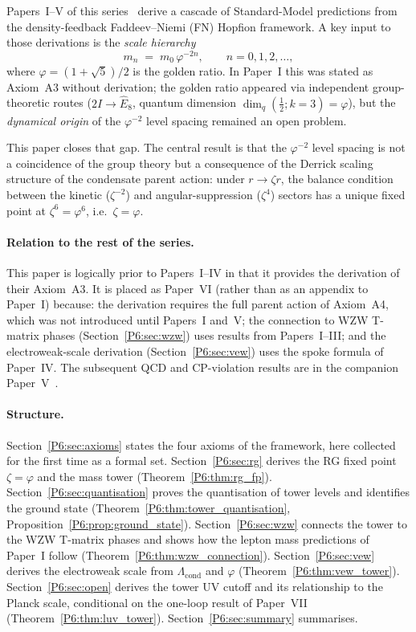 \documentclass[11pt,a4paper]{article}
\theoremstyle{definition}
\theoremstyle{remark}
\newcommand{\vp}{\varphi}
\newcommand{\Lcond}{\Lambda_{\mathrm{cond}}}
\begin{document}
Papers~I--V of this series~\cite{Paper1,Paper2,Paper3,Paper4,Paper5} derive
a cascade of Standard-Model predictions from the density-feedback
Faddeev--Niemi (FN) Hopfion framework.  A key input to those derivations
is the \emph{scale hierarchy}
\begin{equation}
  m_n \;=\; m_0\,\vp^{-2n}, \qquad n = 0, 1, 2, \ldots,
  \label{P6:eq:tower_intro}
\end{equation}
where $\vp = (1+\sqrt{5})/2$ is the golden ratio.  In Paper~I this
was stated as Axiom~A3 without derivation; the golden ratio appeared
via independent group-theoretic routes ($2I \to \hat{E}_8$, quantum
dimension $\dim_q(\tfrac{1}{2};k{=}3)=\vp$), but the \emph{dynamical
origin} of the $\vp^{-2}$ level spacing remained an open problem.

This paper closes that gap.  The central result is that the $\vp^{-2}$
level spacing is not a coincidence of the group theory but a
consequence of the Derrick scaling structure of the condensate parent
action: under $r \to \zeta r$, the balance condition between the
kinetic ($\zeta^{-2}$) and angular-suppression ($\zeta^4$) sectors has
a unique fixed point at $\zeta^6 = \vp^6$, i.e.\ $\zeta = \vp$.

\paragraph{Relation to the rest of the series.}
This paper is logically prior to Papers~I--IV in that it provides the
derivation of their Axiom~A3.  It is placed as Paper~VI (rather than
as an appendix to Paper~I) because: the derivation requires the full
parent action of Axiom~A4, which was not introduced until Papers~I
and~V; the connection to WZW T-matrix phases (Section~\ref{P6:sec:wzw})
uses results from Papers~I--III; and the electroweak-scale derivation
(Section~\ref{P6:sec:vew}) uses the spoke formula of Paper~IV.
The subsequent QCD and CP-violation results are in the companion
Paper~V~\cite{Paper5}.

\paragraph{Structure.}
Section~\ref{P6:sec:axioms} states the four axioms of the framework,
here collected for the first time as a formal set.
Section~\ref{P6:sec:rg} derives the RG fixed point $\zeta = \vp$ and the
mass tower (Theorem~\ref{P6:thm:rg_fp}).
Section~\ref{P6:sec:quantisation} proves the quantisation of tower levels
and identifies the ground state (Theorem~\ref{P6:thm:tower_quantisation},
Proposition~\ref{P6:prop:ground_state}).
Section~\ref{P6:sec:wzw} connects the tower to the WZW T-matrix phases
and shows how the lepton mass predictions of Paper~I follow
(Theorem~\ref{P6:thm:wzw_connection}).
Section~\ref{P6:sec:vew} derives the electroweak scale from $\Lcond$ and
$\vp$ (Theorem~\ref{P6:thm:vew_tower}).
Section~\ref{P6:sec:open} derives the tower UV cutoff and its relationship
to the Planck scale, conditional on the one-loop result of
Paper~VII (Theorem~\ref{P6:thm:luv_tower}).
Section~\ref{P6:sec:summary} summarises.
\end{document}

